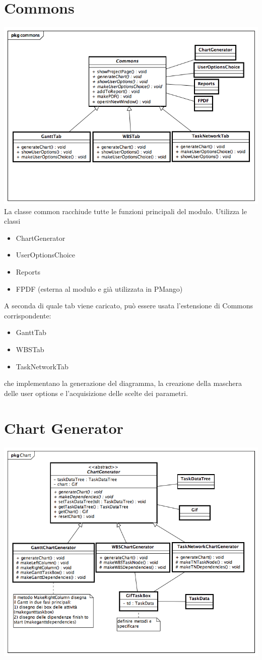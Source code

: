 \documentclass[a4paper, 12pt]{report}
\begin{document}
\section{Commons}
\includegraphics[width=\textwidth]{diagramma_classe/commons.png}
La classe common racchiude tutte le funzioni principali del modulo. Utilizza le classi
\begin{itemize}
	\item ChartGenerator
	\item UserOptionsChoice
	\item Reports
	\item FPDF (esterna al modulo e gi\`a utilizzata in PMango)
\end{itemize}
A seconda di quale tab viene caricato, pu\`o essere usata l'estensione di Commons corrispondente: 
\begin{itemize}
	\item GanttTab
	\item WBSTab
	\item TaskNetworkTab
\end{itemize}
che implementano la generazione del diagramma, la creazione della maschera delle user options e l'acquisizione delle scelte dei parametri.
\section{Chart Generator}
\includegraphics[width=\textwidth]{diagramma_classe/chart.png}
\end{document}
